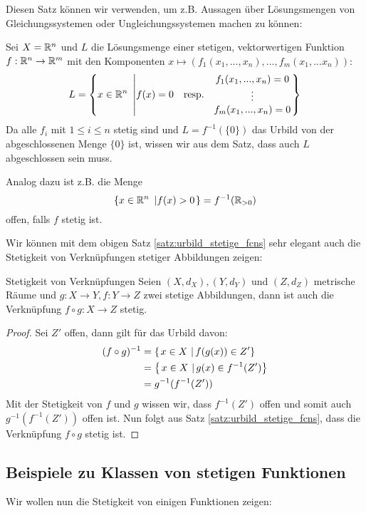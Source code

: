 Diesen Satz können wir verwenden, um z.B. Aussagen über Lösungsmengen von Gleichungssystemen oder Ungleichungssystemen machen zu können:

\begin{example} Sei $X = \mathbb{R}^n$ und $L$ die Lösungsmenge einer stetigen, vektorwertigen Funktion $f: \mathbb{R}^n \to \mathbb{R}^m$ mit den Komponenten $x \mapsto (f_1(x_1,...,x_n), ..., f_m(x_1,...x_n))$:
$$ L = \left\{x \in \mathbb{R}^n  \ \left|  f(x)=0\quad \text{resp.}\quad \begin{matrix}f_1(x_1, ..., x_n) = 0\\ \vdots \\ f_m(x_1, ..., x_n) = 0 \end{matrix} \right.\right\}$$
Da alle $f_i$ mit $1 \leq i \leq n$ stetig sind und $L = f^{-1}(\{0\})$ das Urbild von der abgeschlossenen Menge $\{0\}$ ist, wissen wir aus dem Satz, dass auch $L$ abgeschlossen sein muss.

Analog dazu ist z.B. die Menge 
$$\left\{x \in \mathbb{R}^n  \ \left|  f(x)>0 \right.\right\} = f^{-1}(\mathbb{R}_{>0})$$
offen, falls $f$ stetig ist.
\end{example}

Wir können mit dem obigen Satz \ref{satz:urbild_stetige_fcns} sehr elegant auch die Stetigkeit von Verknüpfungen stetiger Abbildungen zeigen:
\begin{satz}{Stetigkeit von Verknüpfungen}{}
Seien $(X, d_X), (Y, d_Y)$ und $(Z, d_Z)$ metrische Räume und $g: X \to Y, f: Y \to Z$ zwei stetige Abbildungen, dann ist auch die Verknüpfung $f \circ g : X \to Z$ stetig.
\end{satz}
\begin{proof}
Sei $Z'$ offen, dann gilt für das Urbild davon:
\begin{align*}
    (f\circ g)^{-1} &= \left\{\left.x \in X \ \right| f(g(x)) \in Z' \right\}\\
    &= \left\{\left.x \in X \ \right| g(x) \in f^{-1}(Z') \right\}\\
    &= g^{-1}(f^{-1}(Z'))
\end{align*}
Mit der Stetigkeit von $f$ und $g$  wissen wir, dass $f^{-1}(Z')$ offen und somit auch $g^{-1}(f^{-1}(Z'))$ offen ist. Nun folgt aus Satz \ref{satz:urbild_stetige_fcns}, dass die Verknüpfung $f\circ g$ stetig ist.
\end{proof}

\subsection{Beispiele zu Klassen von stetigen Funktionen}
Wir wollen nun die Stetigkeit von einigen Funktionen zeigen:

